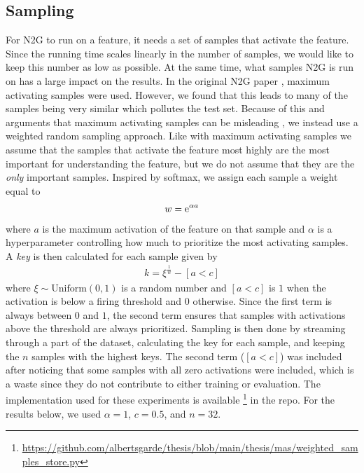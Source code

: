 \subsection{Sampling}
\label{sec:sampling}
For N2G to run on a feature, it needs a set of samples that activate the feature.
Since the running time scales linearly in the number of samples, we would like to keep this number as low as possible.
At the same time, what samples N2G is run on has a large impact on the results.
In the original N2G paper \parencite{foote_neuron_2023}, maximum activating samples were used.
However, we found that this leads to many of the samples being very similar which pollutes the test set.
Because of this and arguments that maximum activating samples can be misleading \parencite{bolukbasi_interpretability_2021}, we instead use a weighted random sampling approach.
Like with maximum activating samples we assume that the samples that activate the feature most highly are the most important for understanding the feature, but we do not assume that they are the \emph{only} important samples.
Inspired by softmax, we assign each sample a weight equal to
\begin{align*}
    w=\mathrm{e}^{\alpha a}
\end{align*}
where $a$ is the maximum activation of the feature on that sample and $\alpha$ is a hyperparameter controlling how much to prioritize the most activating samples.
A \emph{key} is then calculated for each sample given by
\begin{align*}
    k=\xi^{\frac1w}-[a<c]
\end{align*}
where $\xi\sim\mathrm{Uniform}(0,1)$ is a random number and $[a<c]$ is $1$ when the activation is below a firing threshold and $0$ otherwise.
Since the first term is always between $0$ and $1$, the second term ensures that samples with activations above the threshold are always prioritized.
Sampling is then done by streaming through a part of the dataset, calculating the key for each sample, and keeping the $n$ samples with the highest keys.
The second term ($[a<c]$) was included after noticing that some samples with all zero activations were included, which is a waste since they do not contribute to either training or evaluation.
The implementation used for these experiments is available \footnote{\url{https://github.com/albertsgarde/thesis/blob/main/thesis/mas/weighted_samples_store.py}} in the repo.
For the results below, we used $\alpha=1$, $c=0.5$, and $n=32$.

